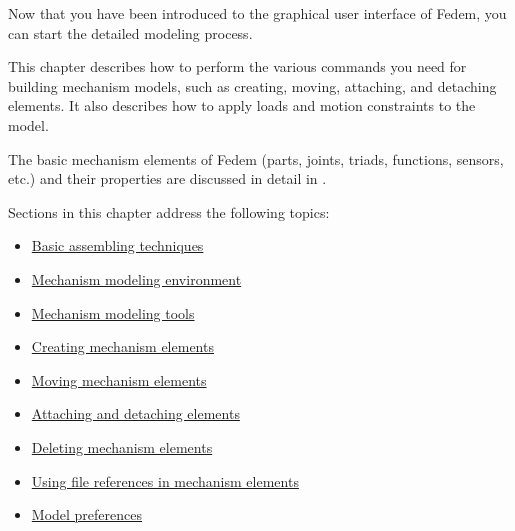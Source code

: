%
%

%
%


Now that you have been introduced to the graphical user interface of Fedem,
you can start the detailed modeling process.

This chapter describes how to perform the various commands you need for building
mechanism models, such as creating, moving, attaching, and detaching elements.
It also describes how to apply loads and motion constraints to the model.

The basic mechanism elements of Fedem (parts, joints, triads, functions,
sensors, etc.) and their properties are discussed in detail in
.

Sections in this chapter address the following topics:

\begin{itemize}
\item
  \protect\hyperlink{basic-assembling-techniques}
                    {Basic assembling techniques}
\item
  \protect\hyperlink{mechanism-modeling-environment}
                    {Mechanism modeling environment}
\item
  \protect\hyperlink{mechanism-modeling-tools}
                    {Mechanism modeling tools}
\item
  \protect\hyperlink{creating-mechanism-elements}
                    {Creating mechanism elements}
\item
  \protect\hyperlink{moving-mechanism-elements}
                    {Moving mechanism elements}
\item
  \protect\hyperlink{attaching-and-detaching-elements}
                    {Attaching and detaching elements}
\item
  \protect\hyperlink{deleting-mechanism-elements}
                    {Deleting mechanism elements}
\item
  \protect\hyperlink{using-file-references-in-mechanism-elements}
                    {Using file references in mechanism elements}
\item
  \protect\hyperlink{model-preferences}
                    {Model preferences}
\end{itemize}

